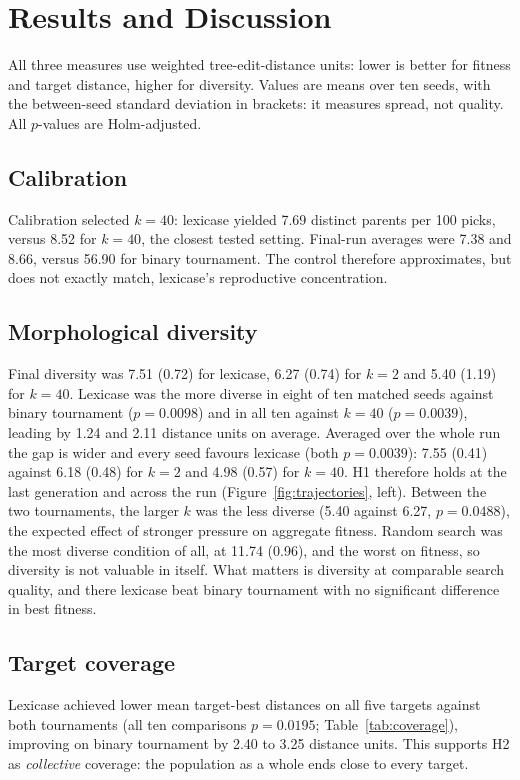 \documentclass[sigconf]{acmart}
\begin{document}
\section{Results and Discussion}
All three measures use weighted tree-edit-distance units: lower is better for fitness and target distance, higher for diversity. Values are means over ten seeds, with the between-seed standard deviation in brackets: it measures spread, not quality. All $p$-values are Holm-adjusted.

\subsection{Calibration}
Calibration selected $k=40$: lexicase yielded 7.69 distinct parents per 100 picks, versus 8.52 for $k=40$, the closest tested setting. Final-run averages were 7.38 and 8.66, versus 56.90 for binary tournament. The control therefore approximates, but does not exactly match, lexicase's reproductive concentration.

\subsection{Morphological diversity}
Final diversity was 7.51 (0.72) for lexicase, 6.27 (0.74) for $k=2$ and 5.40 (1.19) for $k=40$. Lexicase was the more diverse in eight of ten matched seeds against binary tournament ($p=0.0098$) and in all ten against $k=40$ ($p=0.0039$), leading by 1.24 and 2.11 distance units on average. Averaged over the whole run the gap is wider and every seed favours lexicase (both $p=0.0039$): 7.55 (0.41) against 6.18 (0.48) for $k=2$ and 4.98 (0.57) for $k=40$. H1 therefore holds at the last generation and across the run (Figure~\ref{fig:trajectories}, left). Between the two tournaments, the larger $k$ was the less diverse (5.40 against 6.27, $p=0.0488$), the expected effect of stronger pressure on aggregate fitness. Random search was the most diverse condition of all, at 11.74 (0.96), and the worst on fitness, so diversity is not valuable in itself. What matters is diversity at comparable search quality, and there lexicase beat binary tournament with no significant difference in best fitness.



\subsection{Target coverage}

Lexicase achieved lower mean target-best distances on all five targets against both tournaments (all ten comparisons $p=0.0195$; Table~\ref{tab:coverage}), improving on binary tournament by 2.40 to 3.25 distance units. This supports H2 as \emph{collective} coverage: the population as a whole ends close to every target.
\end{document}
